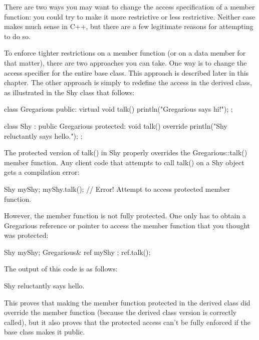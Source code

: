 
There are two ways you may want to change the access specification of a member function: you could try to make it more restrictive or less restrictive. Neither case makes much sense in C++, but there are a few legitimate reasons for attempting to do so.

To enforce tighter restrictions on a member function (or on a data member for that matter), there are two approaches you can take. One way is to change the access specifier for the entire base class. This approach is described later in this chapter. The other approach is simply to redefine the access in the derived class, as illustrated in the Shy class that follows:

\begin{cpp}
class Gregarious
{
    public:
        virtual void talk() { println("Gregarious says hi!"); }
};

class Shy : public Gregarious
{
    protected:
        void talk() override { println("Shy reluctantly says hello."); }
};
\end{cpp}

The protected version of talk() in Shy properly overrides the Gregarious::talk() member function. Any client code that attempts to call talk() on a Shy object gets a compilation error:

\begin{cpp}
Shy myShy;
myShy.talk(); // Error! Attempt to access protected member function.
\end{cpp}

However, the member function is not fully protected. One only has to obtain a Gregarious reference or pointer to access the member function that you thought was protected:

\begin{cpp}
Shy myShy;
Gregarious& ref { myShy };
ref.talk();
\end{cpp}

The output of this code is as follows:

\begin{shell}
Shy reluctantly says hello.
\end{shell}

This proves that making the member function protected in the derived class did override the member function (because the derived class version is correctly called), but it also proves that the protected access can’t be fully enforced if the base class makes it public.

